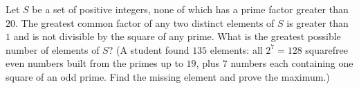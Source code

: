 Let $S$ be a set of positive integers, none of which has a prime factor greater than $20$. The greatest common factor of any two distinct elements of $S$ is greater than $1$ and is not divisible by the square of any prime. What is the greatest possible number of elements of $S$? (A student found $135$ elements: all $2^7=128$ squarefree even numbers built from the primes up to $19$, plus $7$ numbers each containing one square of an odd prime. Find the missing element and prove the maximum.)
